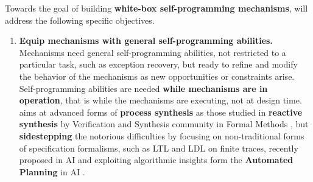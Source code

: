 Towards the goal of building \textbf{white-box self-programming mechanisms}, \project will address the following specific objectives. %
\begin{enumerate}

\item \textbf{Equip mechanisms with general self-programming abilities.}
Mechanisms need general self-programming abilities, not
  restricted to a particular task, such as exception recovery, but ready
  to refine and modify the behavior of the mechanisms as new
  opportunities or constraints arise. 
Self-programming abilities are needed \textbf{while mechanisms
    are in operation}, that is while the mechanisms are executing, not
   at design time.
\project aims at                           
  advanced forms of \textbf{process synthesis} as those studied in
  \textbf{reactive synthesis} by Verification and Synthesis
  community in Formal Methods \cite{PnRo89,Vardi17}, but
  \textbf{sidestepping} the notorious difficulties
     by focusing on non-traditional forms of
  specification formalisms, such as LTL and LDL on finite
    traces, recently proposed in
  AI \cite{TorresB15,DeVa15,DeVa16,CamachoTMBM17} 
and exploiting algorithmic insights form the \textbf{Automated Planning} in AI
  \cite{GeffnerBo13,GNT2016,NauGT15}.




\end{enumerate}
